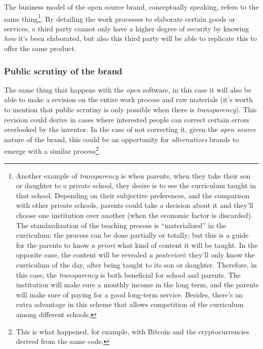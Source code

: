 \documentclass[12pt,a4paper]{article}
\begin{document}
The business model of the open source brand, conceptually speaking, refers to the same thing\footnote{Another example of \textit{transparency} is when parents, when they take their son or daughter to a private school, they desire is to see the curriculum taught in that school. Depending on their subjective preferences, and the comparison with other private schools, parents could take a decision about it and they'll choose one institution over another (when the economic factor is discarded). The standardization of the teaching process is “materialized” in the curriculum: the process can be done partially or totally; but this is a guide for the parents to know \textit{a priori} what kind of content it will be taught. In the opposite case, the content will be revealed \textit{a posteriori}: they'll only know the curriculum of the day, after being taught to its son or daughter. Therefore, in this case, the \textit{transparency} is both beneficial for school and parents. The institution will make sure a monthly income in the long term, and the parents will make sure of paying for a good long-term service. Besides, there's an extra advantage in this scheme that allows competition of the curriculum among different schools.}. By detailing the work processes to elaborate certain goods or services, a third party cannot only have a higher degree of security by knowing \textit{how} it's been elaborated, but also this third party will be able to replicate this to offer the same product.

\subsubsection{Public scrutiny of the brand}
The same thing that happens with the \textit{open} software, in this case it will also be able to make a revision on the entire work process and raw materials (it's worth to mention that public scrutiny is only possible when there is \textit{transparency}). This revision could derive in cases where interested people can correct certain errors overlooked by the inventor. In the case of not correcting it, given the \textit{open source} nature of the brand, this could be an opportunity for \textit{alternatives} brands to emerge with a similar process\footnote{This is what happened, for example, with Bitcoin and the cryptocurrencies derived from the same code.}.
\end{document}
